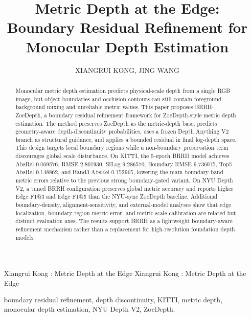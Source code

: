\documentclass{ieeeaccess}
\begin{document}

\title{Metric Depth at the Edge: Boundary Residual Refinement for Monocular Depth Estimation}
\author{\uppercase{Xiangrui Kong}, \uppercase{Jing Wang}}
\address[1]{Xi'an Institute of Applied Optics, Xi'an 710065, China}

\markboth
{Xiangrui Kong \headeretal: Metric Depth at the Edge}
{Xiangrui Kong \headeretal: Metric Depth at the Edge}


\begin{abstract}
Monocular metric depth estimation predicts physical-scale depth from a single RGB image, but object boundaries and occlusion contours can still contain foreground-background mixing and unreliable metric values. This paper proposes BRRH-ZoeDepth, a boundary residual refinement framework for ZoeDepth-style metric depth estimation. The method preserves ZoeDepth as the metric-depth base, predicts geometry-aware depth-discontinuity probabilities, uses a frozen Depth Anything V2 branch as structural guidance, and applies a bounded residual in final log-depth space. This design targets local boundary regions while a non-boundary preservation term discourages global scale disturbance. On KITTI, the 5-epoch BRRH model achieves AbsRel 0.069576, RMSE 2.801930, SILog 9.286570, Boundary RMSE 9.736915, Top5 AbsRel 0.148862, and Band3 AbsRel 0.152965, lowering the main boundary-band metric errors relative to the previous strong boundary-gated variant. On NYU Depth V2, a tuned BRRH configuration preserves global metric accuracy and reports higher Edge F1@3 and Edge F1@5 than the NYU-sync ZoeDepth baseline. Additional boundary-density, alignment-sensitivity, and external-model analyses show that edge localization, boundary-region metric error, and metric-scale calibration are related but distinct evaluation axes. The results support BRRH as a lightweight boundary-aware refinement mechanism rather than a replacement for high-resolution foundation depth models.
\end{abstract}

\begin{keywords}
boundary residual refinement, depth discontinuity, KITTI, metric depth, monocular depth estimation, NYU Depth V2, ZoeDepth.
\end{keywords}
\end{document}
